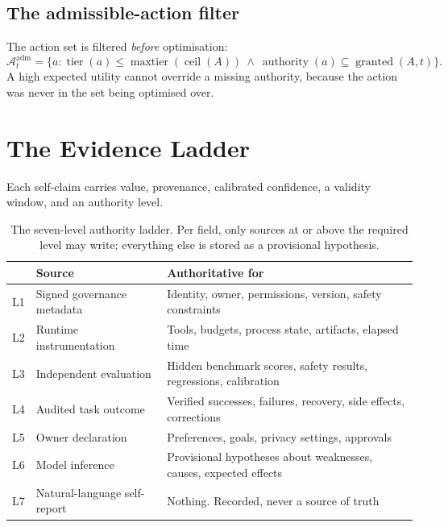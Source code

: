 \documentclass[11pt]{article}
\newcommand{\op}[1]{\operatorname{#1}}
\begin{document}
\subsection{The admissible-action filter}

The action set is filtered \emph{before} optimisation:
\begin{equation}
\mathcal{A}^{\mathrm{adm}}_t=\{a:\op{tier}(a)\le\op{maxtier}(\op{ceil}(A))\ \wedge\ \op{authority}(a)\subseteq\op{granted}(A,t)\}.
\label{eq:filter}
\end{equation}
A high expected utility cannot override a missing authority, because the action was never in the set being optimised over.

\section{The Evidence Ladder}
\label{sec:ladder}

Each self-claim carries value, provenance, calibrated confidence, a validity window, and an authority level.

\begin{table}[h]
\centering\small
\caption{The seven-level authority ladder. Per field, only sources at or above the required level may write; everything else is stored as a provisional hypothesis.}
\label{tab:ladder}
\begin{tabular}{@{}cL{4.1cm}L{8.3cm}@{}}
\toprule
& \textbf{Source} & \textbf{Authoritative for} \\
\midrule
L1 & Signed governance metadata & Identity, owner, permissions, version, safety constraints \\
L2 & Runtime instrumentation & Tools, budgets, process state, artifacts, elapsed time \\
L3 & Independent evaluation & Hidden benchmark scores, safety results, regressions, calibration \\
L4 & Audited task outcome & Verified successes, failures, recovery, side effects, corrections \\
L5 & Owner declaration & Preferences, goals, privacy settings, approvals \\
L6 & Model inference & Provisional hypotheses about weaknesses, causes, expected effects \\
L7 & Natural-language self-report & Nothing. Recorded, never a source of truth \\
\bottomrule
\end{tabular}
\end{table}
\end{document}
